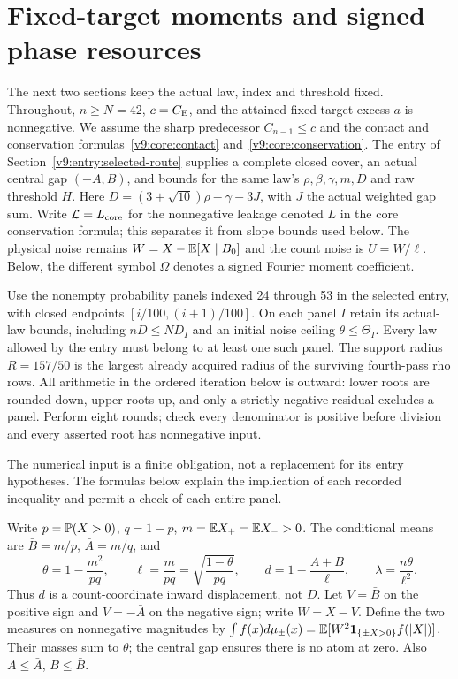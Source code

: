 \section{Fixed-target moments and signed phase resources}
\label{v9:resources:section}

The next two sections keep the actual law, index and threshold fixed.
Throughout, $n\ge N=42$, $c=C_{\mathrm E}$, and the attained fixed-target excess
$a$ is nonnegative. We assume the sharp predecessor
$C_{n-1}\le c$ and the contact and conservation
formulas~\eqref{v9:core:contact} and~\eqref{v9:core:conservation}.
The entry of Section~\ref{v9:entry:selected-route} supplies a complete
closed cover, an actual central gap $(-A,B)$, and bounds for the same
law's $\rho,\beta,\gamma,m,D$ and raw threshold $H$.
Here $D=(3+\sqrt{10})\rho-\gamma-3J$, with $J$ the actual weighted gap
sum. Write $\mathcal L=L_{\rm core}$ for the nonnegative leakage denoted
$L$ in the core conservation formula; this separates it from slope
bounds used below.
The physical noise remains $W=X-\mathbb E[X\mid B_0]$ and the count noise is
$U=W/\ell$. Below, the different symbol $\Omega$ denotes a signed
Fourier moment coefficient.

\begin{condition}\label{v9:resources:input}
Use the nonempty probability panels indexed 24 through 53 in the selected
entry, with closed endpoints $[i/100,(i+1)/100]$. On each panel $I$ retain
its actual-law bounds, including $nD\le ND_I$ and an initial noise ceiling
$\theta\le\Theta_I$. Every law allowed by the entry must belong to at
least one such panel. The support radius $R=157/50$ is the largest
already acquired radius of the surviving fourth-pass rho rows.
All arithmetic in the ordered iteration below is outward: lower roots
are rounded down, upper roots up, and only a strictly negative residual
excludes a panel. Perform eight rounds; check every denominator is
positive before division and every asserted root has nonnegative input.
\end{condition}

The numerical input is a finite obligation, not a replacement for its
entry hypotheses. The formulas below explain the implication of each
recorded inequality and permit a check of each entire panel.

Write \(p=\mathbb P(X>0)\), \(q=1-p\), \(m=\mathbb E X_+=\mathbb E X_->0\).
The conditional means are \(\bar B=m/p\), \(\bar A=m/q\), and
\[
 \theta=1-\frac{m^2}{pq},\qquad
 \ell=\frac m{pq}=\sqrt{\frac{1-\theta}{pq}},\qquad
 d=1-\frac{A+B}{\ell},\qquad
 \lambda=\frac{n\theta}{\ell^2}.
\]
Thus \(d\) is a count-coordinate inward displacement, not \(D\).
Let \(V=\bar B\) on the positive sign and \(V=-\bar A\) on the negative sign;
write \(W=X-V\). Define the two measures on nonnegative magnitudes by
\(\int f(x)d\mu_\pm(x)=\mathbb E[W^2\mathbf1_{\{\pm X>0\}}f(|X|)]\).
Their masses sum to \(\theta\); the central gap ensures there is no atom at zero.
Also \(A\le\bar A\), \(B\le\bar B\).

